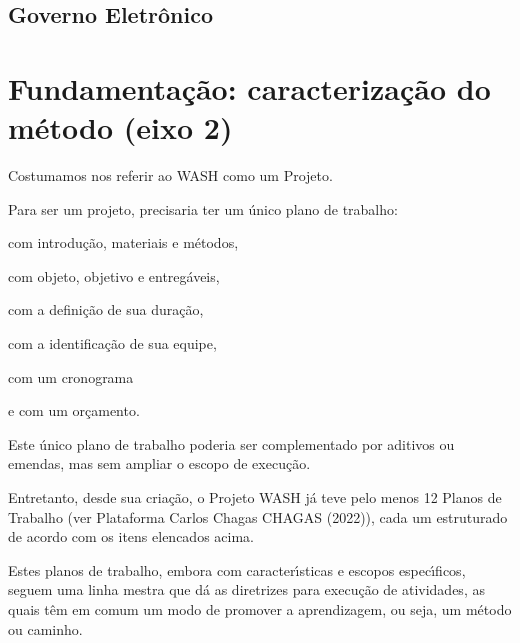 \documentclass[
12pt,		%
openright,	%
twoside,  %
a4paper,			%
chapter=TITLE,		%
english,			%
french,				%
spanish,			%
brazil				%
]{USPSC-classe/USPSC}
\begin{document}
\subsection[Governo Eletr\^onico]{Governo Eletr\^onico}\label{Governo Eletr\^onico}
\section[Fundamenta\c{c}\~ao: caracteriza\c{c}\~ao do m\'etodo (eixo 2)]{Fundamenta\c{c}\~ao: caracteriza\c{c}\~ao do m\'etodo (eixo 2)}\label{Fundamenta\c{c}\~ao: caracteriza\c{c}\~ao do m\'etodo (eixo 2)}
Costumamos nos referir ao WASH como um Projeto.










Para ser um projeto, precisaria ter um \'unico plano de trabalho:











\begin{alineas}
\item com introdu\c{c}\~ao, materiais e m\'etodos,
\item com objeto, objetivo e entreg\'aveis,
\item com a defini\c{c}\~ao de sua dura\c{c}\~ao,
\item com a identifica\c{c}\~ao de sua equipe,
\item com um cronograma
\item e com um or\c{c}amento.
\end{alineas}

Este \'unico plano de trabalho poderia ser complementado por aditivos ou emendas, mas sem ampliar o escopo de execu\c{c}\~ao.










Entretanto, desde sua cria\c{c}\~ao, o Projeto WASH j\'a teve pelo menos 12 Planos de Trabalho (ver Plataforma Carlos Chagas  CHAGAS (2022)), cada um estruturado de acordo com os itens elencados acima.










Estes planos de trabalho, embora com caracter\'{\i}sticas e escopos espec\'{\i}ficos, seguem uma linha mestra que d\'a as diretrizes para execu\c{c}\~ao de atividades, as quais t\^em em comum um modo de promover a aprendizagem, ou seja, um m\'etodo ou \textquotedbl caminho\textquotedbl .
\end{document}
